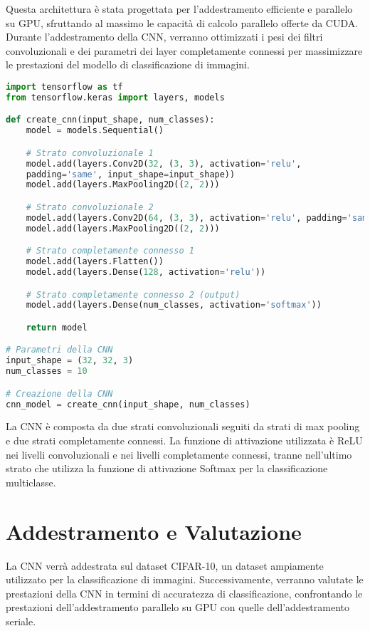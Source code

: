 \documentclass{article}
\begin{document}
Questa architettura è stata progettata per l'addestramento efficiente e parallelo su GPU, sfruttando al massimo le capacità di calcolo parallelo offerte da CUDA. Durante l'addestramento della CNN, verranno ottimizzati i pesi dei filtri convoluzionali e dei parametri dei layer completamente connessi per massimizzare le prestazioni del modello di classificazione di immagini.
\begin{lstlisting}[language=Python, basicstyle=\small]
import tensorflow as tf
from tensorflow.keras import layers, models

def create_cnn(input_shape, num_classes):
    model = models.Sequential()

    # Strato convoluzionale 1
    model.add(layers.Conv2D(32, (3, 3), activation='relu', 
    padding='same', input_shape=input_shape))
    model.add(layers.MaxPooling2D((2, 2)))

    # Strato convoluzionale 2
    model.add(layers.Conv2D(64, (3, 3), activation='relu', padding='same'))
    model.add(layers.MaxPooling2D((2, 2)))

    # Strato completamente connesso 1
    model.add(layers.Flatten())
    model.add(layers.Dense(128, activation='relu'))

    # Strato completamente connesso 2 (output)
    model.add(layers.Dense(num_classes, activation='softmax'))

    return model

# Parametri della CNN
input_shape = (32, 32, 3)
num_classes = 10

# Creazione della CNN
cnn_model = create_cnn(input_shape, num_classes)
\end{lstlisting}

La CNN è composta da due strati convoluzionali seguiti da strati di max pooling e due strati completamente connessi. La funzione di attivazione utilizzata è ReLU nei livelli convoluzionali e nei livelli completamente connessi, tranne nell'ultimo strato che utilizza la funzione di attivazione Softmax per la classificazione multiclasse.

\section{Addestramento e Valutazione}
La CNN verrà addestrata sul dataset CIFAR-10, un dataset ampiamente utilizzato per la classificazione di immagini. Successivamente, verranno valutate le prestazioni della CNN in termini di accuratezza di classificazione, confrontando le prestazioni dell'addestramento parallelo su GPU con quelle dell'addestramento seriale.
\end{document}

